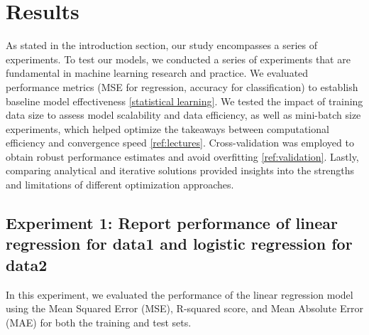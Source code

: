 \documentclass{article}
\begin{document}
\section{Results}
\label{sec:results}

As stated in the introduction section, our study encompasses a series of experiments. To test our models, we conducted a series of experiments that are fundamental in machine learning research and practice. We evaluated performance metrics (MSE for regression, accuracy for classification) to establish baseline model effectiveness \ref{statistical learning}. We tested the impact of training data size to assess model scalability and data efficiency, as well as mini-batch size experiments, which helped optimize the takeaways between computational efficiency and convergence speed \ref{ref:lectures}. Cross-validation was employed to obtain robust performance estimates and avoid overfitting \ref{ref:validation}. Lastly, comparing analytical and iterative solutions provided insights into the strengths and limitations of different optimization approaches.

\subsection{Experiment 1: Report performance of linear regression for data1 and logistic regression for data2}

In this experiment, we evaluated the performance of the linear regression model using the Mean Squared Error (MSE), R-squared score, and Mean Absolute Error (MAE) for both the training and test sets.
\end{document}
